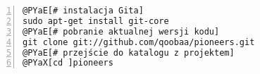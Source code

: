 \begin{Verbatim}[commandchars=@\[\],numbers=left,firstnumber=1,stepnumber=1]
@PYaE[# instalacja Gita]
sudo apt-get install git-core
@PYaE[# pobranie aktualnej wersji kodu]
git clone git://github.com/qoobaa/pioneers.git
@PYaE[# przejście do katalogu z projektem]
@PYaX[cd ]pioneers
\end{Verbatim}
